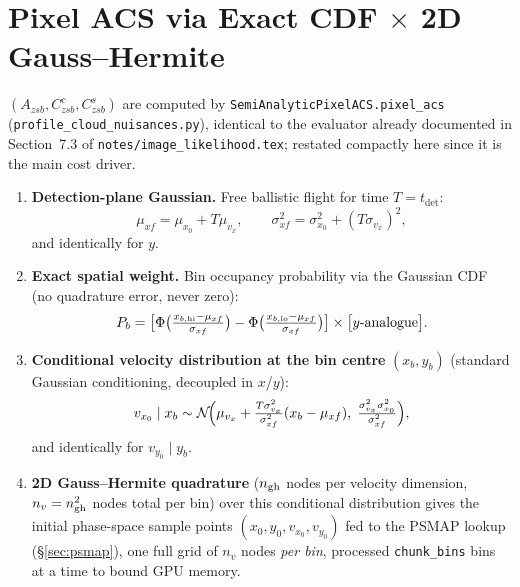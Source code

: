 \documentclass[11pt,a4paper]{article}
\newcommand{\N}{\mathcal{N}}
\newcommand{\code}[1]{\texttt{#1}}
\begin{document}
\section{Pixel ACS via Exact CDF $\times$ 2D Gauss--Hermite}
\label{sec:acs}

$(A_{zsb}, C^c_{zsb}, C^s_{zsb})$ are computed by
\code{SemiAnalyticPixelACS.pixel\_acs} (\code{profile\_cloud\_nuisances.py}),
identical to the evaluator already documented in Section~7.3 of
\code{notes/image\_likelihood.tex}; restated compactly here since it is the
main cost driver.

\begin{enumerate}
  \item \textbf{Detection-plane Gaussian.} Free ballistic flight for time
    $T=t_\mathrm{det}$:
    \begin{equation}
      \mu_{xf} = \mu_{x_0} + T\mu_{v_x}, \qquad
      \sigma_{xf}^2 = \sigma_{x_0}^2 + (T\sigma_{v_x})^2,
    \end{equation}
    and identically for $y$.

  \item \textbf{Exact spatial weight.} Bin occupancy probability via the
    Gaussian CDF (no quadrature error, never zero):
    \begin{equation}
      P_b = \bigl[\Phi\bigl(\tfrac{x_{b,\rm hi}-\mu_{xf}}{\sigma_{xf}}\bigr)
                 - \Phi\bigl(\tfrac{x_{b,\rm lo}-\mu_{xf}}{\sigma_{xf}}\bigr)\bigr]
            \times \bigl[y\text{-analogue}\bigr].
    \end{equation}

  \item \textbf{Conditional velocity distribution at the bin centre}
    $(x_b,y_b)$ (standard Gaussian conditioning, decoupled in $x$/$y$):
    \begin{equation}
      v_{x_0}\mid x_b \sim \N\!\Bigl(
        \mu_{v_x} + \tfrac{T\sigma_{v_x}^2}{\sigma_{xf}^2}(x_b-\mu_{xf}),\;
        \tfrac{\sigma_{v_x}^2\sigma_{x_0}^2}{\sigma_{xf}^2}\Bigr),
    \end{equation}
    and identically for $v_{y_0}\mid y_b$.

  \item \textbf{2D Gauss--Hermite quadrature} ($n_{\rm gh}$ nodes per
    velocity dimension, $n_v=n_{\rm gh}^2$ nodes total per bin) over this
    conditional distribution gives the initial phase-space sample points
    $(x_0,y_0,v_{x_0},v_{y_0})$ fed to the PSMAP lookup
    (\S\ref{sec:psmap}), one full grid of $n_v$ nodes \emph{per bin},
    processed \code{chunk\_bins} bins at a time to bound GPU memory.


\end{enumerate}
\end{document}
